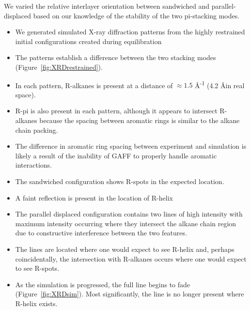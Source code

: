 \documentclass{article}
\newcommand{\angstrom}{\textup{\AA}}
\begin{document}
  We varied the relative interlayer orientation between sandwiched and 
  parallel-displaced based on our knowledge of the stability of the two
  pi-stacking modes.
  \begin{itemize}
  	\item We generated simulated X-ray diffraction patterns from the highly
	restrained initial configurations created during equilibration
	\item The patterns establish a difference between the two stacking 
	modes (Figure~\ref{fig:XRDrestrained}).
	\item In each pattern, R-alkanes is present at a distance of $\approx
	1.5$ \angstrom \textsuperscript{-1} (4.2 \angstrom in real space).
  	\item R-pi is also present in each pattern, although it appears to 
	intersect R-alkanes because the spacing between aromatic rings is 
	similar to the alkane chain packing.
	\item The difference in aromatic ring spacing between experiment and
	simulation is likely a result of the inability of GAFF to properly handle
	aromatic interactions. %
	\item The sandwiched configuration shows R-spots in the expected location.
	\item A faint reflection is present in the location of R-helix %
	\item The parallel displaced configuration contains two lines of high 
	intensity with maximum intensity occurring where they intersect the alkane
	chain region due to constructive interference between the two features.
	\item The lines are located where one would expect to see R-helix and, 
	perhaps coincidentally, the intersection with R-alkanes occurs where one 
	would expect to see R-spots.
	\item As the simulation is progressed, the full line begins to fade 
	(Figure~\ref{fig:XRDsim}). Most significantly, the line is no longer present
	where R-helix exists.
  \end{itemize}
\end{document}
